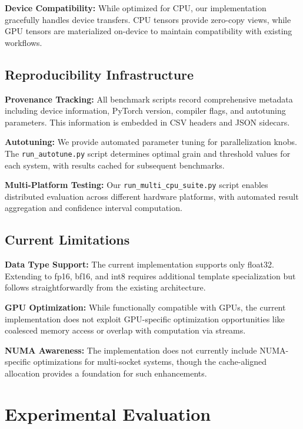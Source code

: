 \documentclass{article}
\numberwithin{equation}{section}
\theoremstyle{plain}
\theoremstyle{definition}
\theoremstyle{remark}
\begin{document}
\textbf{Device Compatibility:} While optimized for CPU, our implementation gracefully handles device transfers. CPU tensors provide zero-copy views, while GPU tensors are materialized on-device to maintain compatibility with existing workflows.

\subsection{Reproducibility Infrastructure}

\textbf{Provenance Tracking:} All benchmark scripts record comprehensive metadata including device information, PyTorch version, compiler flags, and autotuning parameters. This information is embedded in CSV headers and JSON sidecars.

\textbf{Autotuning:} We provide automated parameter tuning for parallelization knobs. The \texttt{run\_autotune.py} script determines optimal grain and threshold values for each system, with results cached for subsequent benchmarks.

\textbf{Multi-Platform Testing:} Our \texttt{run\_multi\_cpu\_suite.py} script enables distributed evaluation across different hardware platforms, with automated result aggregation and confidence interval computation.

\subsection{Current Limitations}

\textbf{Data Type Support:} The current implementation supports only float32. Extending to fp16, bf16, and int8 requires additional template specialization but follows straightforwardly from the existing architecture.

\textbf{GPU Optimization:} While functionally compatible with GPUs, the current implementation does not exploit GPU-specific optimization opportunities like coalesced memory access or overlap with computation via streams.

\textbf{NUMA Awareness:} The implementation does not currently include NUMA-specific optimizations for multi-socket systems, though the cache-aligned allocation provides a foundation for such enhancements.

\section{Experimental Evaluation} \label{sec:evaluation}
\end{document}
